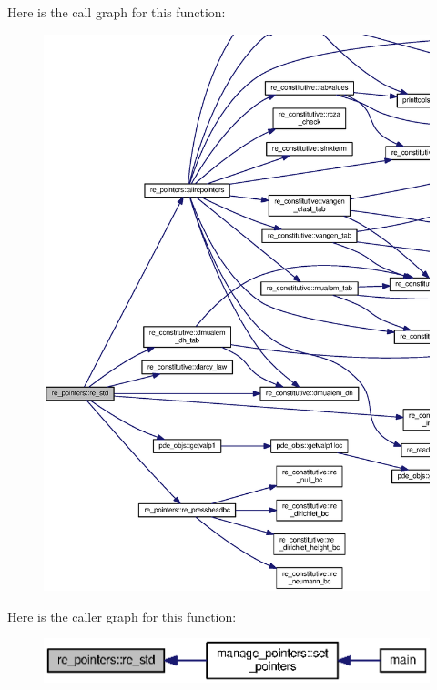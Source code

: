 Here is the call graph for this function\+:\nopagebreak
\begin{figure}[H]
\begin{center}
\leavevmode
\includegraphics[width=350pt]{namespacere__pointers_adc1e1c0ad055044eb884aeb7b9f2814c_cgraph}
\end{center}
\end{figure}




Here is the caller graph for this function\+:\nopagebreak
\begin{figure}[H]
\begin{center}
\leavevmode
\includegraphics[width=350pt]{namespacere__pointers_adc1e1c0ad055044eb884aeb7b9f2814c_icgraph}
\end{center}
\end{figure}


